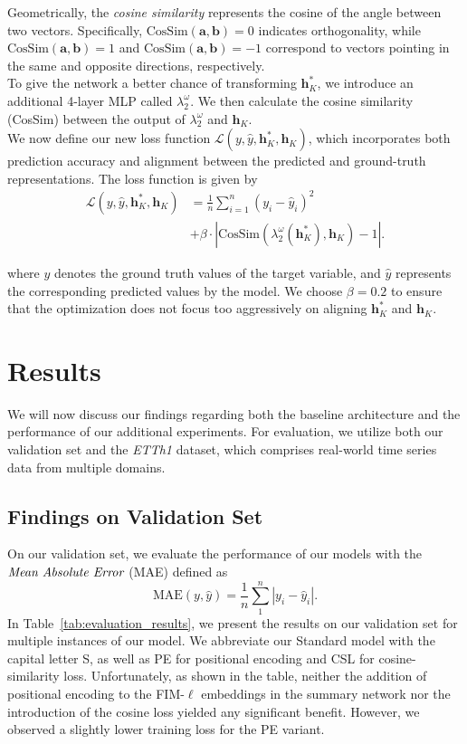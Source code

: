 \documentclass{article}
\theoremstyle{plain}
\theoremstyle{definition}
\theoremstyle{remark}
\begin{document}
Geometrically, the \emph{cosine similarity} represents the cosine of the angle between two vectors. Specifically, $\text{CosSim}(\mathbf{a}, \mathbf{b}) = 0$ indicates orthogonality, while $\text{CosSim}(\mathbf{a}, \mathbf{b}) = 1$ and $\text{CosSim}(\mathbf{a}, \mathbf{b}) = -1$ correspond to vectors pointing in the same and opposite directions, respectively.\\
To give the network a better chance of transforming $\mathbf{h}^*_K$, we introduce an additional 4-layer MLP called $\lambda_2^{\omega}$. We then calculate the cosine similarity (CosSim) between the output of $\lambda_2^{\omega}$ and $\mathbf{h}_K$.\\
We now define our new loss function $\mathcal{L}(y, \hat{y}, \mathbf{h}^*_K, \mathbf{h}_K)$, which incorporates both prediction accuracy and alignment between the predicted and ground-truth representations. The loss function is given by
\[
\begin{aligned}
\mathcal{L}(y,\hat{y},\mathbf{h}^*_K,\mathbf{h}_K) &= 
\frac{1}{n}\sum_{i=1}^{n}(y_i - \hat{y}_i)^2   \\
&+ \beta \cdot |\text{CosSim}(\lambda_2^{\omega}(\mathbf{h}^*_K),\mathbf{h}_K) - 1|.
\end{aligned}
\]


where $y$ denotes the ground truth values of the target variable, and $\hat{y}$ represents the corresponding predicted values by the model. We choose $\beta = 0.2$ to ensure that the optimization does not focus too aggressively on aligning $\mathbf{h}^*_K$ and $\mathbf{h}_K$.







\section{Results}
We will now discuss our findings regarding both the baseline architecture and the performance of our additional experiments. For evaluation, we utilize both our validation set and the \emph{ETTh1} dataset, which comprises real-world time series data from multiple domains.
\subsection{Findings on Validation Set}
On our validation set, we evaluate the performance of our models with the 
$\emph{Mean Absolute Error}$ (MAE) defined as
\[
\text{MAE}(y,\hat{y}) = \frac{1}{n}\sum_{1}^{n}|y_i-\hat{y}_i|.
\]
In Table~\ref{tab:evaluation_results}, we present the results on our validation set for multiple instances of our model. We abbreviate our Standard model with the capital letter S, as well as PE for positional encoding and CSL for cosine-similarity loss. Unfortunately, as shown in the table, neither the addition of positional encoding to the FIM-$\ell$ embeddings in the summary network nor the introduction of the cosine loss yielded any significant benefit. However, we observed a slightly lower training loss for the PE variant.
\end{document}
